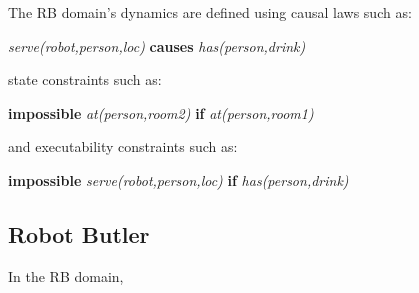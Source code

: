 

The RB domain's dynamics are defined using causal laws such as:

\textit{serve(robot,person,loc)} \textbf{causes} \textit{has(person,drink)}

state constraints such as:

\textbf{impossible} \textit{at(person,room2)} \textbf{if} \textit{at(person,room1)}

and executability constraints such as:

\textbf{impossible} \textit{serve(robot,person,loc)} \textbf{if} \textit{has(person,drink)}



\subsection{Robot Butler}

In the RB domain,












